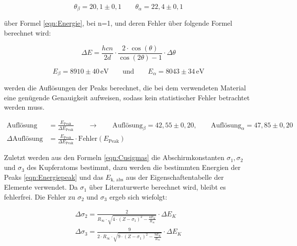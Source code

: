 \documentclass[titlepage = firstcover]{scrartcl}
\begin{document}
            \begin{equation*}
              \theta_{\beta} = 20,1 \pm 0,1     \qquad \theta_{\alpha} = 22,4 \pm 0,1
            \end{equation*}

            \noindent
            über Formel \ref{eqn:Energie}, bei n=1, und deren Fehler über folgende Formel berechnet wird:

            \begin{equation*}
              \Delta E = \frac{hcn}{2d} \cdot \frac{2 \cdot \cos(\theta)}{\cos(2\theta)-1} \cdot \Delta \theta
            \end{equation*}
            
            \begin{equation}
              E_{\beta} = 8910 \pm 40 \, \text{eV} \qquad \text{und} \qquad E_{\alpha} = 8043 \pm 34\, \text{eV}
              \label{eqn:Energiepeak}
            \end{equation}
            
            \noindent
            werden die Auflösungen der Peaks berechnet, die bei dem verwendeten Material eine genügende Genauigkeit aufweisen, sodass kein statistischer Fehler betrachtet werden muss. 

            \begin{align*}
              \text{Auflösung} &= \frac{E_{\text{Peak}}}{\Delta E_{\text{Peak}}} \qquad \longrightarrow \qquad \text{Auflösung}_{\beta} = 42,55 \pm 0,20 , \qquad \text{Auflösung}_{\alpha} = 47,85 \pm 0,20 \\
              \Delta \text{Auflösung} &= \frac{ E_{\text{Peak}}}{\Delta E_{\text{Peak}}} \cdot \text{Fehler}(E_{\text{Peak}})
            \end{align*}
            
            \noindent
            Zuletzt werden aus den Formeln \ref{eqn:Cusigmas} die Abschirmkonstanten $\sigma_1, \sigma_2$ und $\sigma_3$ des Kupferatoms bestimmt, dazu werden die bestimmten Energien der Peaks
            \ref{eqn:Energiepeak} und das $E_{\text{k, abs}}$ aus der Eigenschaftentabelle der Elemente verwendet. Da $\sigma_1$ über Literaturwerte berechnet wird, bleibt es fehlerfrei. Die Fehler zu
            $\sigma_2$ und $\sigma_3$ ergeb sich wiefolgt:

            \begin{align*}
              \Delta \sigma_2 = \frac{2}{R_{\infty} \cdot \sqrt{4 \cdot \left(Z - \sigma_1 \right)^2 - \frac{4E_K}{R_{\infty}}}} \cdot \Delta E_K \\
              \Delta \sigma_3 = \frac{9}{2 \cdot R_{\infty} \cdot \sqrt{9 \cdot \left(Z - \sigma_1 \right)^2 - \frac{9E_K}{R_{\infty}}}} \cdot \Delta E_K
            \end{align*}
            
\end{document}
